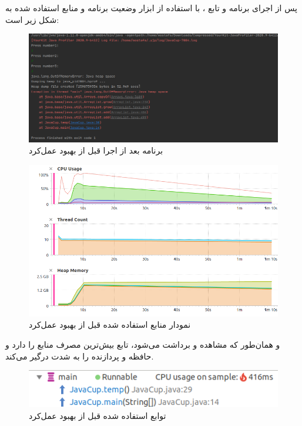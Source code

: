 
پس از اجرای برنامه و تابع ، با استفاده از ابزار  وضعیت برنامه و منابع استفاده شده به شکل زیر است:

\begin{figure}[!hbpt]
	\centering
	\includegraphics[scale=0.35]{./img/before/3.png}
	\caption{برنامه بعد از اجرا قبل از بهبود عمل‌کرد}
\end{figure}


\begin{figure}[!hbpt]
	\centering
	\includegraphics[scale=0.5]{./img/before/1.png}
	\caption{نمودار منابع استفاده شده قبل از بهبود عمل‌کرد}
\end{figure}


و همان‌طور که مشاهده و برداشت می‌شود، تابع  بیش‌ترین مصرف منابع را دارد و حافظه و پردازنده‌ را به شدت درگیر می‌کند.

\begin{figure}[!hbpt]
	\centering
	\includegraphics[scale=0.5]{./img/before/2.png}
	\caption{توابع استفاده شده قبل از بهبود عمل‌کرد}
\end{figure}


